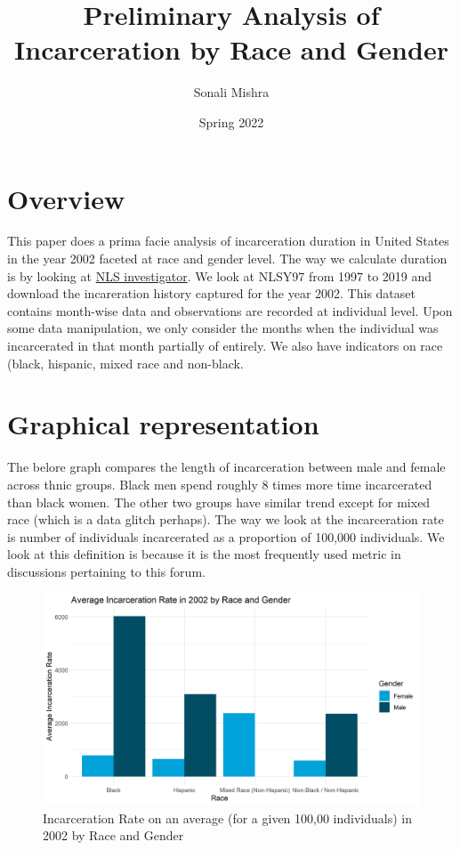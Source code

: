 \documentclass{article}
\author{Sonali Mishra}
\title{Preliminary Analysis of Incarceration by Race and Gender}
\date{Spring 2022}
\begin{document}
\maketitle

\section{Overview}

This paper does a prima facie analysis of incarceration duration in United States in the year 2002 faceted at race and gender level. The way we calculate duration is by looking at \href{https://www.nlsinfo.org/investigator/pages/search}{NLS investigator}. We look at NLSY97 from 1997 to 2019 and download the incareration history captured for the year 2002. This dataset contains month-wise data and observations are recorded at individual level. Upon some data manipulation, we only consider the months when the individual was incarcerated in that month partially of entirely. We also have indicators on race (black, hispanic, mixed race and non-black. 

\section{Graphical representation}

The belore graph compares the length of incarceration between male and female across thnic groups. Black men spend roughly 8 times more time incarcerated than black women. The other two groups have similar trend except for mixed race (which is a data glitch perhaps). The way we look at the incarceration rate is number of individuals incarcerated as a proportion of 100,000 individuals. We look at this definition is because it is the most frequently used metric in discussions pertaining to this forum.

\begin{figure}[H]
    \begin{center}
        \includegraphics[width=.85\textwidth]{incar_rate_by_racegender}
    \end{center}
    \caption{Incarceration Rate on an average (for a given 100,00 individuals) in 2002 by Race and Gender}
    \label{fig:graph}
\end{figure}
\end{document}
